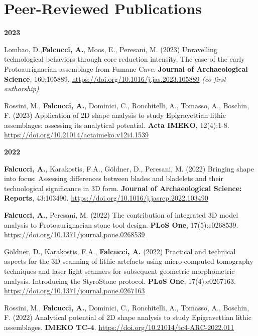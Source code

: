\documentclass[11pt,a4paper,]{awesome-cv}
\begin{document}
\hypertarget{peer-reviewed-publications}{%
\section{Peer-Reviewed Publications}\label{peer-reviewed-publications}}

\small
\setlength{\leftskip}{0cm}

\textbf{2023}

\setlength{\leftskip}{1cm}

Lombao, D.,\textbf{Falcucci, A.}, Moos, E., Peresani, M. (2023)
Unravelling technological behaviors through core reduction intensity.
The case of the early Protoaurignacian assemblage from Fumane Cave.
\textbf{Journal of Archaeological Science}, 160:105889.
\url{https://doi.org/10.1016/j.jas.2023.105889} \emph{(co-first
authorship)}

Rossini, M., \textbf{Falcucci, A.}, Dominici, C., Ronchitelli, A.,
Tomasso, A., Boschin, F. (2023) Application of 2D shape analysis to
study Epigravettian lithic assemblages: assessing its analytical
potential. \textbf{Acta IMEKO}, 12(4):1-8.
\url{https://doi.org/10.21014/actaimeko.v12i4.1539}

\setlength{\leftskip}{0cm}

\textbf{2022}

\setlength{\leftskip}{1cm}

\textbf{Falcucci, A.}, Karakostis, F.A., Göldner, D., Peresani, M.
(2022) Bringing shape into focus: Assessing differences between blades
and bladelets and their technological significance in 3D form.
\textbf{Journal of Archaeological Science: Reports}, 43:103490.
\url{https://doi.org/10.1016/j.jasrep.2022.103490}

\textbf{Falcucci, A.}, Peresani, M. (2022) The contribution of
integrated 3D model analysis to Protoaurignacian stone tool design.
\textbf{PLoS One}, 17(5):e0268539.
\url{https://doi.org/10.1371/journal.pone.0268539}

Göldner, D., Karakostis, F.A., \textbf{Falcucci, A.} (2022) Practical
and technical aspects for the 3D scanning of lithic artefacts using
micro-computed tomography techniques and laser light scanners for
subsequent geometric morphometric analysis. Introducing the StyroStone
protocol. \textbf{PLoS One}, 17(4):e0267163.
\url{https://doi.org/10.1371/journal.pone.0267163}

Rossini, M., \textbf{Falcucci, A.}, Dominici, C., Ronchitelli, A.,
Tomasso, A., Boschin, F. (2022) Analytical potential of 2D shape
analysis to study Epigravettian lithic assemblages. \textbf{IMEKO TC-4}.
\url{https://doi.org/10.21014/tc4-ARC-2022.011}
\end{document}
